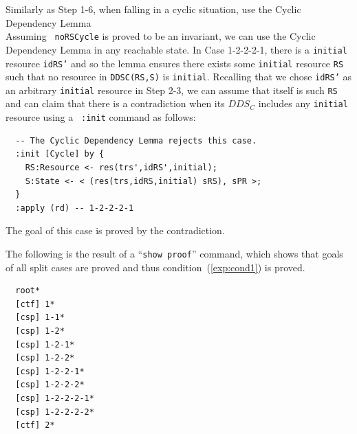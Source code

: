 \documentclass[12pt]{report}
\newcommand{\stt}[1]{{\small{\tt {#1}}}}
\begin{document}
 Similarly as Step 1-6, when falling in a
cyclic situation, use the Cyclic Dependency Lemma \\ Assuming {\tt
  noRSCycle} is proved to be an invariant, we can use the Cyclic
Dependency Lemma in any reachable state. In Case 1-2-2-2-1, there is a
{\tt initial} resource {\tt idRS'} and so the lemma ensures there
exists some {\tt initial} resource {\tt RS} such that no resource in
\stt{DDSC(RS,S)} is {\tt initial}. Recalling that we chose {\tt idRS'}
as an arbitrary {\tt initial} resource in Step 2-3, we can assume that
itself is such {\tt RS} and can claim that there is a contradiction
when its $DDS_C$ includes any {\tt initial} resource using a {\tt
  :init} command as follows:
\begin{verbatim}
  -- The Cyclic Dependency Lemma rejects this case.
  :init [Cycle] by {
    RS:Resource <- res(trs',idRS',initial);
    S:State <- < (res(trs,idRS,initial) sRS), sPR >;
  }
  :apply (rd) -- 1-2-2-2-1
\end{verbatim}
The goal of this case is proved by the contradiction.

The following is the result of a ``\stt{show proof}'' command, which shows
that goals of all split cases are proved and thus
condition~(\ref{exp:cond1}) is proved.
\begin{verbatim}
  root*
  [ctf] 1*
  [csp] 1-1*
  [csp] 1-2*
  [csp] 1-2-1*
  [csp] 1-2-2*
  [csp] 1-2-2-1*
  [csp] 1-2-2-2*
  [csp] 1-2-2-2-1*
  [csp] 1-2-2-2-2*
  [ctf] 2*
\end{verbatim}
\end{document}
